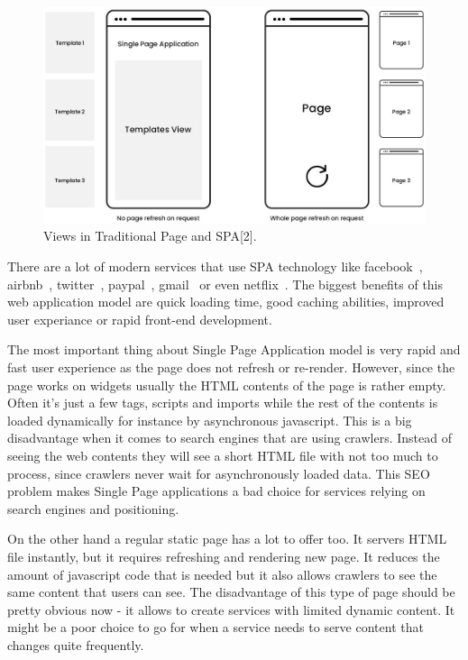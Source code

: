 \documentclass[a4paper,12pt]{book}
\begin{document}
{{\begin{figure}[h!]
\centering
\includegraphics[width=1.0\textwidth]{spa-template}
\caption{Views in Traditional Page and SPA[2].}
\label{fig:spaviews}
\end{figure} 

\bigskip
There are a lot of modern services that use SPA technology like facebook~\cite{facebook}, airbnb~\cite{airbnb}, twitter~\cite{twitter}, paypal~\cite{paypal}, gmail~\cite{gmail} or even netflix~\cite{netflix}. The biggest benefits of this web application model are quick loading time, good caching abilities, improved user experiance or rapid front-end development. 

\bigskip
The most important thing about Single Page Application model is very rapid and fast user experience as the page does not refresh or re-render. However, since the page works on widgets usually the HTML contents of the page is rather empty. Often it's just a few tags, scripts and imports while the rest of the contents is loaded dynamically for instance by asynchronous javascript. This is a big disadvantage when it comes to search engines that are using crawlers. Instead of seeing the web contents they will see a short HTML file with not too much to process, since crawlers never wait for asynchronously loaded data. This SEO problem makes Single Page applications a bad choice for services relying on search engines and positioning.

\bigskip
On the other hand a regular static page has a lot to offer too. It servers HTML file instantly, but it requires refreshing and rendering new page. It reduces the amount of javascript code that is needed but it also allows crawlers to see the same content that users can see. The disadvantage of this type of page should be pretty obvious now - it allows to create services with limited dynamic content. It might be a poor choice to go for when a service needs to serve content that changes quite frequently.


}}
\end{document}
